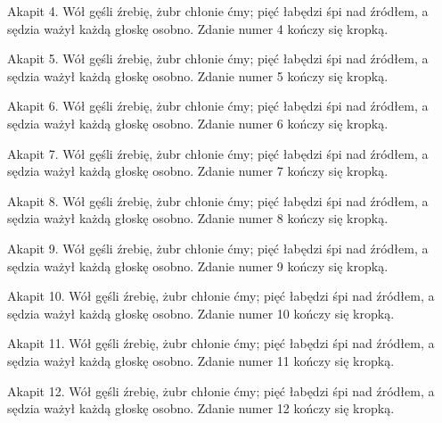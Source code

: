 Akapit 4. Wół gęśli źrebię, żubr chłonie ćmy; pięć łabędzi śpi nad źródłem, a sędzia ważył każdą głoskę osobno. Zdanie numer 4 kończy się kropką.

Akapit 5. Wół gęśli źrebię, żubr chłonie ćmy; pięć łabędzi śpi nad źródłem, a sędzia ważył każdą głoskę osobno. Zdanie numer 5 kończy się kropką.

Akapit 6. Wół gęśli źrebię, żubr chłonie ćmy; pięć łabędzi śpi nad źródłem, a sędzia ważył każdą głoskę osobno. Zdanie numer 6 kończy się kropką.

Akapit 7. Wół gęśli źrebię, żubr chłonie ćmy; pięć łabędzi śpi nad źródłem, a sędzia ważył każdą głoskę osobno. Zdanie numer 7 kończy się kropką.

Akapit 8. Wół gęśli źrebię, żubr chłonie ćmy; pięć łabędzi śpi nad źródłem, a sędzia ważył każdą głoskę osobno. Zdanie numer 8 kończy się kropką.

Akapit 9. Wół gęśli źrebię, żubr chłonie ćmy; pięć łabędzi śpi nad źródłem, a sędzia ważył każdą głoskę osobno. Zdanie numer 9 kończy się kropką.

Akapit 10. Wół gęśli źrebię, żubr chłonie ćmy; pięć łabędzi śpi nad źródłem, a sędzia ważył każdą głoskę osobno. Zdanie numer 10 kończy się kropką.

Akapit 11. Wół gęśli źrebię, żubr chłonie ćmy; pięć łabędzi śpi nad źródłem, a sędzia ważył każdą głoskę osobno. Zdanie numer 11 kończy się kropką.

Akapit 12. Wół gęśli źrebię, żubr chłonie ćmy; pięć łabędzi śpi nad źródłem, a sędzia ważył każdą głoskę osobno. Zdanie numer 12 kończy się kropką.

